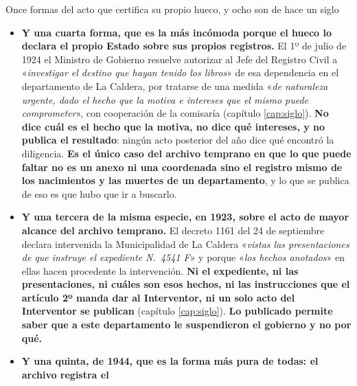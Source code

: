 \begin{ficha}{Once formas del acto que certifica su propio hueco, y ocho son de hace un siglo}
\begin{itemize}[leftmargin=*,nosep]
\textbf{Y la serie tiene un final que conviene decir, porque este capítulo casi nunca registra
desmentidos.} En 1946 el Boletín publica el \textbf{balance del movimiento de la renta} de la
comuna del departamento, cuarto trimestre de 1945, \textbf{con sus renglones y sus saldos
mensuales} ---noventa y ocho pesos con quince centavos al cerrar octubre--- y firma al pie de
cada mes. \textbf{Después de cinco actos económicos publicados sin una sola cifra entre 1922 y
1927, y de un resumen de caja transcripto en 1938, se publica el balance.} Lo firma un interventor, y es el único balance con sus renglones de todo
el período. \textbf{La opacidad de esta serie no fue un estado permanente: fue una práctica que
empezó, duró veinticuatro años y se interrumpió}, y eso dice más sobre ella que si hubiera sido
constante.
\item \textbf{Y una cuarta forma, que es la más incómoda porque el hueco lo declara el propio
Estado sobre sus propios registros.} El 1º de julio de 1924 el Ministro de Gobierno resuelve
autorizar al Jefe del Registro Civil a «\textit{investigar el destino que hayan tenido los
libros}» de esa dependencia en el departamento de La Caldera, por tratarse de una medida
«\textit{de naturaleza urgente, dado el hecho que la motiva e intereses que el mismo puede
comprometer}», con cooperación de la comisaría (capítulo \ref{cap:siglo}). \textbf{No dice cuál
es el hecho que la motiva, no dice qué intereses, y no publica el resultado}: ningún acto
posterior del año dice qué encontró la diligencia. \textbf{Es el único caso del archivo temprano
en que lo que puede faltar no es un anexo ni una coordenada sino el registro mismo de los
nacimientos y las muertes de un departamento}, y lo que se publica de eso es que hubo que ir a
buscarlo.
\item \textbf{Y una tercera de la misma especie, en 1923, sobre el acto de mayor alcance del
archivo temprano.} El decreto 1161 del 24 de septiembre declara intervenida la Municipalidad de
La Caldera «\textit{vistas las presentaciones de que instruye el expediente N.\ 4541 F}» y
porque «\textit{los hechos anotados}» en ellas hacen procedente la intervención. \textbf{Ni el
expediente, ni las presentaciones, ni cuáles son esos hechos, ni las instrucciones que el
artículo 2º manda dar al Interventor, ni un solo acto del Interventor se publican} (capítulo
\ref{cap:siglo}). \textbf{Lo publicado permite saber que a este departamento le suspendieron el
gobierno y no por qué.}
\item \textbf{Y una quinta, de 1944, que es la forma más pura de todas: el archivo registra el
}
\end{itemize}
\end{ficha}
